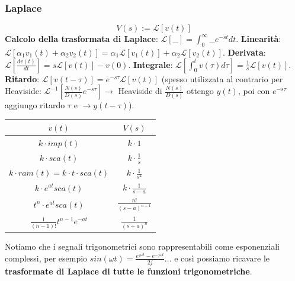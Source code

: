 \begin{landscape}
    \subsubsection*{Laplace}
    \[
        V(s) := \mathcal{L}[v(t)]
    \]
    \textbf{Calcolo della trasformata di Laplace}: $\mathcal{L}[\_\_] =  \int_{0}^{\infty}\_\_ e^{-st} dt$.\newline
    \textbf{Linearità}: $\mathcal{L}[\alpha_1 v_1(t) + \alpha_2 v_2(t)] = \alpha_1 \mathcal{L}[v_1(t)] + \alpha_2 \mathcal{L}[v_2(t)]$.\newline
    \textbf{Derivata}: $\mathcal{L}\left[ \frac{d v(t)}{dt} \right] = s \mathcal{L}[v(t)] - v(0)$.\newline
    \textbf{Integrale}: $\mathcal{L}\left[ \int_{0}^{t} v(\tau) d \tau \right] = \frac{1}{s} \mathcal{L}[v(t)]$.\newline
    \textbf{Ritardo}: $ \mathcal{L}[ v(t - \tau)] = e^{-s \tau} \mathcal{L}[v(t)]$ (spesso utilizzata al contrario per Heaviside: $\mathcal{L}^{-1}\left[\frac{N(s)}{D(s)}e^{-s \tau}\right] \rightarrow $ Heaviside di $\frac{N(s)}{D(s)}$ ottengo $y(t)$, poi con $e^{-s \tau}$ aggiungo ritardo $\tau$ e $\rightarrow  y(t- \tau)$).\newline
    \renewcommand{\arraystretch}{2}
    \begin{center}
        \begin{tabular}{ |c|c| } 
        \hline
        \;\;\;\;\;\;\;\;\;\;\;\;\;\;\;$v(t)$ \;\;\;\;\;\;\;\;\;\;\;\;\;\;\;& \;\;\;\;\;\;\;\;\;\;\;\;\;\;\;$V(s)$ \;\;\;\;\;\;\;\;\;\;\;\;\;\;\;\\ 
        \hline
        $k \cdot imp(t)$ & $k \cdot 1$ \\ 
        $k \cdot sca(t)$ & $k \cdot \frac{1}{s}$  \\ 
        $k \cdot ram(t) =k \cdot t \cdot  sca(t)$ & $k \cdot \frac{1}{s^2}$ \\
        $k \cdot e^{at}sca(t)$ & $k \cdot \frac{1}{s-a}$ \\ 
        $t^{n}\cdot e^{at}sca(t)$ & $\frac{n!}{(s-a)^{n+1}}$\\ 
        $\frac{1}{(n-1)!} t^{n-1}e^{-at}$ & $\frac{1}{(s+a)^n}$\\
        \hline
        \end{tabular}
    \end{center}
    \renewcommand{\arraystretch}{1}
    Notiamo che i segnali trigonometrici sono rappresentabili come esponenziali complessi, per esempio $sin(\omega t) = \frac{e^{j \omega t}- e^{-j \omega t}}{2j} \dots$ e così possiamo ricavare le \textbf{trasformate di Laplace di tutte le funzioni trigonometriche}.

\end{landscape}
